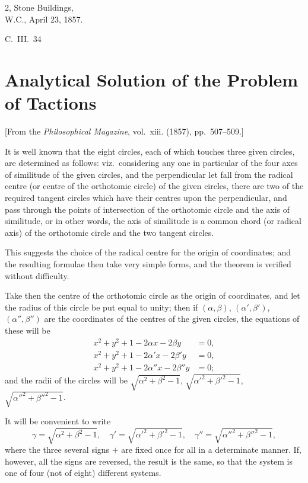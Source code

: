 \documentclass[11pt,a4paper]{article}
\theoremstyle{plain}
\begin{document}
\begin{flushright}
2, Stone Buildings,\\
W.C., April 23, 1857.
\end{flushright}
\hfill C.~III.~34
\newpage


\section{Analytical Solution of the Problem of Tactions}
\label{sec:207}

[From the \textit{Philosophical Magazine}, vol.~xiii. (1857), pp.~507--509.]
\vspace{1em}

It is well known that the eight circles, each of which touches three given circles, are determined as follows: viz.\ considering any one in particular of the four axes of similitude of the given circles, and the perpendicular let fall from the radical centre (or centre of the orthotomic circle) of the given circles, there are two of the required tangent circles which have their centres upon the perpendicular, and pass through the points of intersection of the orthotomic circle and the axis of similitude, or in other words, the axis of similitude is a common chord (or radical axis) of the orthotomic circle and the two tangent circles.

This suggests the choice of the radical centre for the origin of coordinates; and the resulting formulae then take very simple forms, and the theorem is verified without difficulty.

Take then the centre of the orthotomic circle as the origin of coordinates, and let the radius of this circle be put equal to unity; then if $(\alpha, \beta)$, $(\alpha', \beta')$, $(\alpha'', \beta'')$ are the coordinates of the centres of the given circles, the equations of these will be
\begin{align*}
x^2 + y^2 + 1 - 2\alpha x - 2\beta y &= 0, \\
x^2 + y^2 + 1 - 2\alpha' x - 2\beta' y &= 0, \\
x^2 + y^2 + 1 - 2\alpha'' x - 2\beta'' y &= 0;
\end{align*}
and the radii of the circles will be $\sqrt{\alpha^2 + \beta^2 - 1}$, $\sqrt{\alpha'^2 + \beta'^2 - 1}$, $\sqrt{\alpha''^2 + \beta''^2 - 1}$.

It will be convenient to write
\[
\gamma = \sqrt{\alpha^2 + \beta^2 - 1}, \quad \gamma' = \sqrt{\alpha'^2 + \beta'^2 - 1}, \quad \gamma'' = \sqrt{\alpha''^2 + \beta''^2 - 1},
\]
where the three several signs $+$ are fixed once for all in a determinate manner. If, however, all the signs are reversed, the result is the same, so that the system is one of four (not of eight) different systems.
\end{document}
